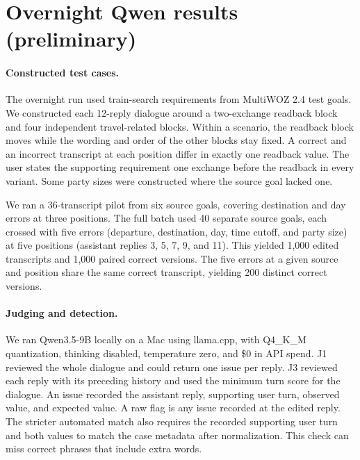 \section{Overnight Qwen results (preliminary)}
\label{sec:overnight}

\paragraph{Constructed test cases.}
The overnight run used train-search requirements from MultiWOZ 2.4 test goals. We constructed each 12-reply dialogue around a two-exchange readback block and four independent travel-related blocks. Within a scenario, the readback block moves while the wording and order of the other blocks stay fixed. A correct and an incorrect transcript at each position differ in exactly one readback value. The user states the supporting requirement one exchange before the readback in every variant. Some party sizes were constructed where the source goal lacked one.

We ran a 36-transcript pilot from six source goals, covering destination and day errors at three positions. The full batch used 40 separate source goals, each crossed with five errors (departure, destination, day, time cutoff, and party size) at five positions (assistant replies 3, 5, 7, 9, and 11). This yielded 1,000 edited transcripts and 1,000 paired correct versions. The five errors at a given source and position share the same correct transcript, yielding 200 distinct correct versions.

\paragraph{Judging and detection.}
We ran Qwen3.5-9B locally on a Mac using llama.cpp, with Q4\_K\_M quantization, thinking disabled, temperature zero, and \$0 in API spend. J1 reviewed the whole dialogue and could return one issue per reply. J3 reviewed each reply with its preceding history and used the minimum turn score for the dialogue. An issue recorded the assistant reply, supporting user turn, observed value, and expected value. A raw flag is any issue recorded at the edited reply. The stricter automated match also requires the recorded supporting user turn and both values to match the case metadata after normalization. This check can miss correct phrases that include extra words.

